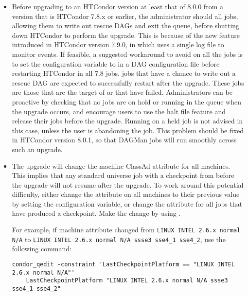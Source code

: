 \begin{itemize}

\item
Before upgrading
to an HTCondor version at least that of 8.0.0 from a version that is HTCondor
7.8.x or earlier, the administrator should  all 
jobs, allowing them to write out rescue DAGs and exit the queue, before
shutting down HTCondor to perform the upgrade.
This is because of
the new feature introduced in HTCondor version 7.9.0, 
in which  uses a single log file to monitor events.
If feasible, a suggested workaround to avoid  on all the
 jobs is to set the configuration variable 
 to
 in a DAG configuration file
 before restarting HTCondor in all 7.8  jobs.
 jobs that have a chance to write out a rescue
DAG
are expected to successfully restart after the upgrade.
These jobs are those that are the target of  or that have failed.
Administrators can be proactive by
checking that no  jobs are on hold or running in the queue when the
upgrade occurs, and encourage users to use the halt file feature and release
their  jobs before the upgrade.  
Running  on a held  job is
not advised in this case, unless the user is abandoning the job.
This problem should be fixed in HTCondor version 8.0.1, so that DAGMan jobs
will run smoothly across such an upgrade.

\item The upgrade will change the machine ClassAd attribute
 for all machines.
This implies that any standard universe job with a checkpoint 
from before the upgrade will not resume after the upgrade.
To work around this potential difficulty, either change the 
attribute  on all machines to their previous value 
by setting the  configuration variable,
or change the  attribute for all jobs
that have produced a checkpoint.
Make the change by using .

For example, if machine attribute  changed 
from \verb;LINUX INTEL 2.6.x normal N/A; to 
\verb;LINUX INTEL 2.6.x normal N/A ssse3 sse4_1 sse4_2;,
use the following command:

\footnotesize
\begin{verbatim}
condor_qedit -constraint 'LastCheckpointPlatform == "LINUX INTEL 2.6.x normal N/A"'
    LastCheckpointPlatform "LINUX INTEL 2.6.x normal N/A ssse3 sse4_1 sse4_2"
\end{verbatim}
\normalsize

\end{itemize}


